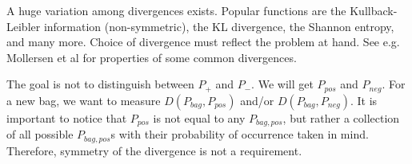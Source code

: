 A huge variation among divergences exists.
Popular functions are the Kullback-Leibler information (non-symmetric), the KL divergence, the Shannon entropy, and many more. 
Choice of divergence must reflect the problem at hand. 
See e.g. {\color{green} Mollersen et al} for properties of some common divergences. 

%
%
%
%
The goal is not to distinguish between $P_+$ and $P_-$.
We will get $P_{pos}$ and $P_{neg}$. 
For a new bag, we want to measure $D(P_{bag},P_{pos})$ and/or $D(P_{bag},P_{neg})$.
It is important to notice that $P_{pos}$ is not equal to any $P_{bag, pos}$, but rather a collection of all possible $P_{bag,pos}$s with their probability of occurrence taken in mind.
Therefore, symmetry of the divergence is not a requirement.

